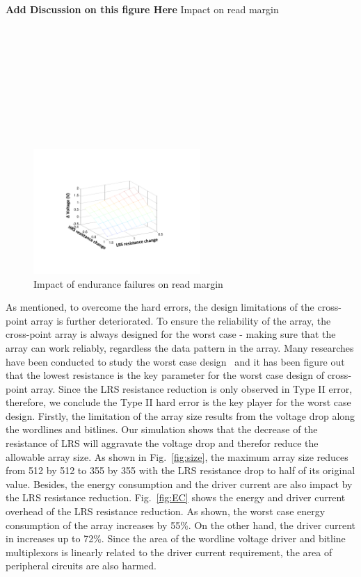 \textbf{Add Discussion on this figure Here}
Impact on read margin
\\\\\\\\\\\\\\\\\\\\
\begin{figure}[!t]
\centering
    \includegraphics[width=2.5in]{./fig/margin.pdf}
\caption{Impact of endurance failures on read margin}
\label{fig:margin}
\end{figure}


As mentioned, to overcome the hard errors, the design limitations of the cross-point array is further deteriorated. To ensure the reliability of the array, the cross-point array is always designed for the worst case - making sure that the array can work reliably, regardless the data pattern in the array. Many researches have been conducted to study the worst case design~\cite{jiale, Dimin_ISLPED} and it has been figure out that the lowest resistance is the key parameter for the worst case design of cross-point array. Since the LRS resistance reduction is only observed in Type II error, therefore, we conclude the Type II hard error is the key player for the worst case design. Firstly, the limitation of the array size results from the voltage drop along the wordlines and bitlines. Our simulation shows that the decrease of the resistance of LRS will aggravate the voltage drop and therefor reduce the allowable array size. As shown in Fig.~\ref{fig:size}, the maximum array size reduces from 512 by 512 to 355 by 355 with the LRS resistance drop to half of its original value. Besides, the energy consumption and the driver current are also impact by the LRS resistance reduction. Fig.~\ref{fig:EC} shows the energy and driver current overhead of the LRS resistance reduction. As shown, the worst case energy consumption of the array increases by 55\%. On the other hand, the driver current in increases up to 72\%. Since the area of the wordline voltage driver and bitline multiplexors is linearly related to the driver current requirement, the area of peripheral circuits are also harmed. 

